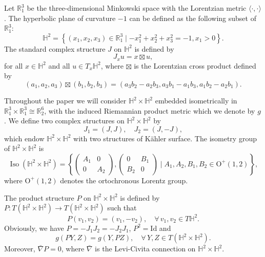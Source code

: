 \documentclass[reqno]{amsart}%
\theoremstyle{definition}
\numberwithin{equation}{section}
\begin{document}
Let $\mathbb{R}_{1}^{3}$ be the three-dimensional Minkowski space with the
Lorentzian metric $\langle\cdot,\cdot\rangle $.
The hyperbolic plane of curvature $-1$ can be defined as the following subset
of $\mathbb{R}_{1}^{3}$: 
$$
\mathbb{H}^{2}=\left\{\left(x_{1}, x_{2}, x_{3}\right) \in \mathbb{R}_{1}^{3}
\mid-x_{1}^{2}+x_{2}^{2}+x_{3}^{2}=-1  , x_{1}>0\right\}.
$$
The standard complex structure $J$ on $\mathbb{H}^{2}$ is defined by
$$J_xu=x\boxtimes u,$$
for all $x\in \mathbb{H}^{2}$ and all $u\in T_x\mathbb{H}^{2}$, where $\boxtimes$
is the Lorentzian cross product defined by
$$
(a_1,a_2,a_3)\boxtimes (b_1,b_2,b_3)=(a_3b_2-a_2b_3, a_3b_1-a_1b_3, a_1b_2-a_2b_1).
$$

Throughout the paper we will consider $\mathbb{H}^2 \times  \mathbb{H}^2$
embedded isometrically  in $\mathbb{R}_{1}^{3} \times \mathbb{R}_{1}^{3} \cong \mathbb{R}_{2}^{6}$,
with the induced Riemannian product metric which we denote by $g$.
We define two complex structures on $\mathbb{H}^2\times \mathbb{H}^2$ by
$$
J_1=(J,J),\quad J_2=(J,-J),
$$
which endow $\mathbb{H}^2 \times  \mathbb{H}^2$ with two structures of K\"ahler surface.
The isometry group of $\mathbb{H}^{2}\times \mathbb{H}^{2}$ is
$$
\operatorname{Iso}\left(\mathbb{H}^{2}\times \mathbb{H}^{2}\right)=\left\{\left(\begin{array}{cc}
A_{1} & 0 \\
0 & A_{2}
\end{array}\right),\left(\begin{array}{cc}
0 & B_1 \\
B_{2} & 0
\end{array}\right) \mid A_{1}, A_{2}, B_1, B_{2} \in \mathrm{O}^{+}(1,2)\right\},
$$
where $\mathrm{O}^{+}(1,2)$ denotes the ortochronous Lorentz group.

The product structure $P$ on $\mathbb{H}^2\times\mathbb{H}^2$ is defined by
$P: T(\mathbb{H}^2\times\mathbb{H}^2)\rightarrow T(\mathbb{H}^2\times\mathbb{H}^2)$ such that
$$
P(v_1,v_2)=(v_1,-v_2), \quad \forall\, v_1, v_2\in T\mathbb{H}^2.
$$
Obviously, we have $P=-J_1J_2=-J_2J_1$, $P^2=\mathrm{Id}$ and
%
\begin{equation}\label{eqn:2.1}
g(PY,Z)=g(Y,PZ), \quad \forall\,Y,Z\in T(\mathbb{H}^2\times\mathbb{H}^2).
\end{equation}
%
Moreover, $\bar{\nabla} P=0$, where $\bar{\nabla}$ is the Levi-Civita connection on
$\mathbb{H}^2\times\mathbb{H}^2$.
\end{document}
